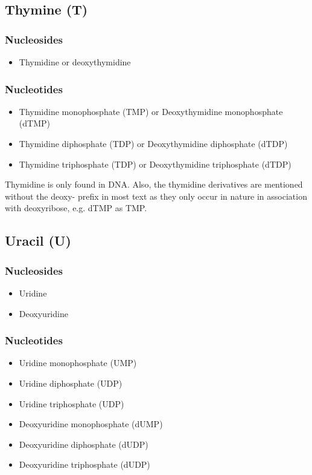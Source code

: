 \documentclass[11pt]{article}
\begin{document}
\subsection{Thymine (T)}
\label{sec:orgd24766b}

\subsubsection{Nucleosides}
\label{sec:orged95b06}
\begin{itemize}
\item Thymidine or deoxythymidine
\end{itemize}
\subsubsection{Nucleotides}
\label{sec:org6e4d93e}
\begin{itemize}
\item Thymidine monophosphate (TMP) or Deoxythymidine monophosphate (dTMP)
\item Thymidine diphosphate (TDP) or Deoxythymidine diphosphate (dTDP)
\item Thymidine triphosphate (TDP) or Deoxythymidine triphosphate (dTDP)
\end{itemize}

Thymidine is only found in DNA. Also, the thymidine derivatives are mentioned without the deoxy- prefix in most text as they only occur in nature in association with deoxyribose, e.g. dTMP as TMP.
\subsection{Uracil (U)}
\label{sec:orga5eff03}

\subsubsection{Nucleosides}
\label{sec:org2c5121d}
\begin{itemize}
\item Uridine
\item Deoxyuridine
\end{itemize}
\subsubsection{Nucleotides}
\label{sec:org6a68e9b}
\begin{itemize}
\item Uridine monophosphate (UMP)
\item Uridine diphosphate (UDP)
\item Uridine triphosphate (UDP)
\item Deoxyuridine monophosphate (dUMP)
\item Deoxyuridine diphosphate (dUDP)
\item Deoxyuridine triphosphate (dUDP)
\end{itemize}
\end{document}
